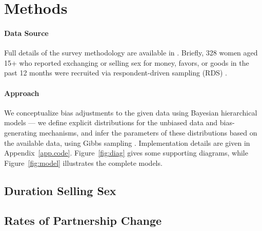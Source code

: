 \section{Methods}\label{meth}
\paragraph{Data Source}
Full details of the survey methodology are available in \cite{Yam2013}.
Briefly, 328 women aged 15+
who reported exchanging or selling sex for money, favors, or goods in the past 12 months
were recruited via respondent-driven sampling (RDS) \cite{Heckathorn1997}.
\paragraph{Approach}
We conceptualize bias adjustments to the given data using Bayesian hierarchical models
--- \ie we define explicit distributions for the unbiased data and bias-generating mechanisms,
and infer the parameters of these distributions based on the available data,
using Gibbs sampling \cite{Geman1984}.
Implementation details are given in Appendix~\ref{app.code}.
Figure~\ref{fig:diag} gives some supporting diagrams, while
Figure~\ref{fig:model} illustrates the complete models.

\subsection{Duration Selling Sex}\label{meth.yss}


\subsection{Rates of Partnership Change}\label{meth.parts}

